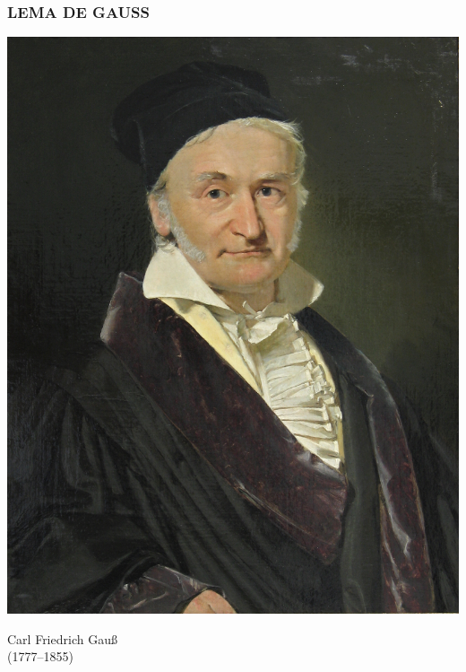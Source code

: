 \begin{frame}
  \frametitle{LEMA DE GAUSS}

  \begin{minipage}[t][0.6\textheight]{0.6\textwidth}
    \vspace{0pt}

    \vspace{1em}


  \end{minipage}
  \begin{minipage}[t]{0.35\textwidth}
    \vspace{0pt}\flushright
    \includegraphics[width=.9\textwidth]{pic/gauss.jpg}

    Carl Friedrich Gauß \\
    (1777--1855)
  \end{minipage}
\end{frame}

